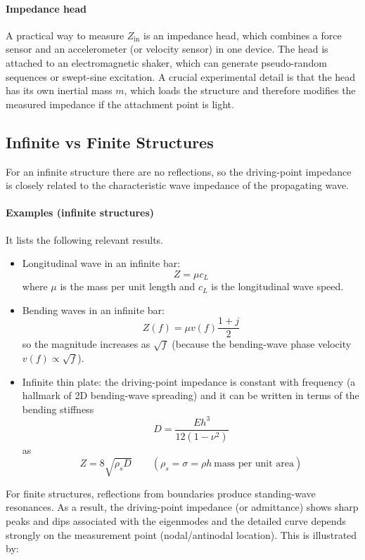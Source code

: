 \paragraph{Impedance head} A practical way to measure \( Z_{\mathrm{in}} \) is an impedance head, which combines a force sensor and an accelerometer (or velocity sensor) in one device. The head is attached to an electromagnetic shaker, which can generate pseudo-random sequences or swept-sine excitation. A crucial experimental detail is that the head has its own inertial mass \( m \), which loads the structure and therefore modifies the measured impedance if the attachment point is light.

\subsection{Infinite vs Finite Structures}

For an infinite structure there are no reflections, so the driving-point impedance is closely related to the characteristic wave impedance of the propagating wave.

\paragraph{Examples (infinite structures)} It lists the following relevant results. 

\begin{itemize}
    \item Longitudinal wave in an infinite bar:
    \[
    Z = \mu c_L
    \]
    where \( \mu \) is the mass per unit length and \( c_L \) is the longitudinal wave speed.
    \item Bending waves in an infinite bar:
    \[
    Z(f) = \mu v(f)\frac{1+j}{2}
    \]
    so the magnitude increases as \( \sqrt{f} \) (because the bending-wave phase velocity \( v(f) \propto \sqrt{f} \)).
    \item Infinite thin plate: the driving-point impedance is constant with frequency (a hallmark of 2D bending-wave spreading) and it can be written in terms of the bending stiffness
    \[
    D = \frac{E h^{3}}{12(1-\nu^{2})}
    \]
    as
    \[
    Z = 8\sqrt{\rho_sD}
    \qquad
    \left(\rho_s = \sigma = \rho h\ \text{mass per unit area}\right)
    \]
\end{itemize}

For finite structures, reflections from boundaries produce standing-wave resonances. As a result, the driving-point impedance (or admittance) shows sharp peaks and dips associated with the eigenmodes and the detailed curve depends strongly on the measurement point (nodal/antinodal location). This is illustrated by:

